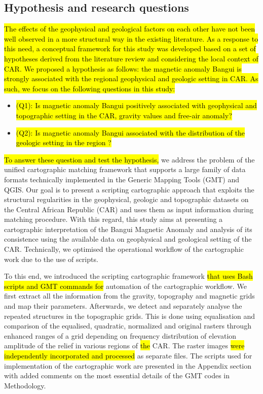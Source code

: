 \documentclass[minerals,article,submit,pdftex,moreauthors]{Definitions/mdpi}
\begin{document}
\subsection{Hypothesis and research questions}

\hl{The effects of the geophysical and geological factors on each other have not been well observed in a more structural way in the existing literature. As a response to this need, a conceptual framework for this study was developed based on a set of hypotheses derived from the literature review and considering the local context of CAR. We proposed a hypothesis as follows: the magnetic anomaly Bangui is strongly associated with the regional geophysical and geologic setting in CAR. As such, we focus on the following questions in this study: }
\begin{itemize}
  \item \hl{(Q1): Is magnetic anomaly Bangui positively associated with geophysical and topographic setting in the CAR, gravity values and free-air anomaly?} 
  \item \hl{(Q2): Is magnetic anomaly Bangui associated with the distribution of the geologic setting in the region ?}
\end{itemize}

\hl{To answer these question and test the hypothesis, }we address the problem of the unified cartographic matching framework that supports a large family of data formats technically implemented in the Generic Mapping Tools (GMT) and QGIS. Our goal is to present a scripting cartographic approach that exploits the structural regularities in the geophysical, geologic and topographic datasets on the Central African Republic (CAR) and uses them as input information during matching procedure. With this regard, this study aims at presenting a cartographic interpretation of the Bangui Magnetic Anomaly and analysis of its consistence using the available data on geophysical and geological setting of the CAR. Technically, we optimised the operational workflow of the cartographic work due to the use of scripts. 

To this end, we introduced the scripting cartographic framework \hl{that uses Bash scripts and GMT commands for} automation of the cartographic workflow. We first extract all the information from the gravity, topography and magnetic grids and map their parameters. Afterwards, we detect and separately analyse the repeated structures in the topographic grids. This is done using equalisation and comparison of the equalised, quadratic, normalized and original rasters through enhanced  ranges of a grid depending on frequency distribution of elevation amplitude of the relief in various regions of \hl{the} CAR. The raster images \hl{were independently incorporated and processed} as separate files. The scripts used for implementation of the cartographic work are presented in the Appendix section with added comments on the most essential details of the GMT codes in Methodology.
\end{document}
